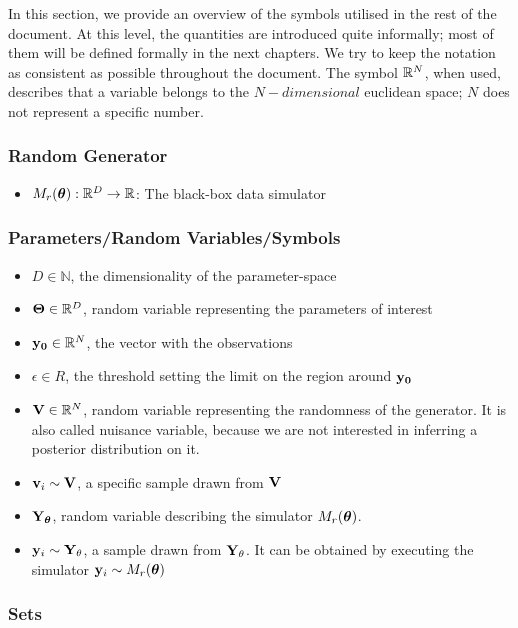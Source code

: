In this section, we provide an overview of the symbols utilised in the rest of the document. At this level, the quantities are
introduced quite informally; most of
them will be defined formally in the next chapters. We try to keep the
notation as consistent as possible throughout the document. The symbol
$\mathbb{R}^N$, when used, describes that a variable belongs to the 
$N-dimensional$ euclidean space; $N$ does not represent a specific
number.

\subsubsection*{Random Generator}
\label{sec:random-generator}
\begin{itemize}
\item $M_r(\boldsymbol{\theta}): \mathbb{R}^D \rightarrow \mathbb{R}$: The black-box data simulator
\end{itemize}

\subsubsection*{Parameters/Random Variables/Symbols}
\label{sec:variables}

\begin{itemize}
\item $D \in \mathbb{N}$, the dimensionality of the parameter-space
\item $\mathbf{\Theta} \in \mathbb{R}^D$, random variable representing the parameters of interest
\item $\mathbf{y_0} \in \mathbb{R}^N$, the vector with the observations
\item $\epsilon \in R$, the threshold setting the limit on the region around $\mathbf{y_0}$
\item $\mathbf{V} \in \mathbb{R}^N$, random variable representing the randomness of
  the generator. It is also called nuisance variable, because we are not interested in inferring a posterior distribution on it.
\item $\mathbf{v}_i \sim \mathbf{V}$, a specific sample drawn from $\mathbf{V}$
\item $\mathbf{Y}_{\boldsymbol{\theta}}$, random variable describing the simulator $M_r(\boldsymbol{\theta})$. 
\item $\mathbf{y}_i \sim \mathbf{Y}_\theta$, a sample drawn from $\mathbf{Y}_\theta$. It can
  be obtained by executing the simulator $\mathbf{y}_i \sim M_r(\boldsymbol{\theta})$
\end{itemize}


\subsubsection*{Sets}
\label{sec:sets}

